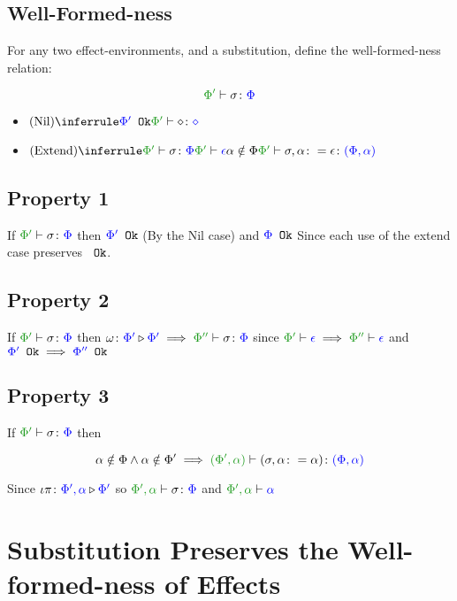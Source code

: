 {\subsection{Well-Formed-ness }

For any two effect-environments, and a substitution, define the well-formed-ness relation:

\begin{equation}
    \typerelation{\P'}{\si}{\P}
\end{equation}

\begin{itemize}
    \item $\ntreeruleI{Nil}{\ok{\P'}}{\typerelation{\P'}{\nil}{\nil}}$
    \item $\ntreeruleIII{Extend}{\typerelation{\P'}{\si}{\P}}{\wellformed{\P'}{\e}}{\a\notin\P}{\typerelation{\P'}{\si, \a \setto\e}{(\P, \a)}}$
\end{itemize}

\subsection{Property 1}
If $\typerelation{\P'}{\si}{\P}$ then ${\color{blue} \Phi'} \texttt{ Ok}$ (By  the 
Nil case) and ${\color{blue} \Phi} \texttt{ Ok}$ Since each use of the extend case preserves ${\color{blue} } \texttt{ Ok}$.

\subsection{Property 2}
If $\typerelation{\P'}{\si}{\P}$ then $\wrelw{\P'}{\P'} \implies \typerelation{\P''}{\si}{\P}$ since $\wellformed{\P'}{\e}\implies \wellformed{\P''}{\e}$ and ${\color{blue} \Phi'} \texttt{ Ok}\implies {\color{blue} \Phi''} \texttt{ Ok}$


\subsection{Property 3}
If $\typerelation{\P'}{\si}{\P}$ then

\begin{equation}
    \a\notin\P\wedge\a\notin\P' \implies \typerelation{(\P', \a)}{(\si, \a\setto\a)}{(\P,\a)}
\end{equation}

Since $\iota\pi \colon {\color{blue}\Phi',\alpha} \triangleright {\color {blue} \Phi'}$ so $\typerelation{\P',\a}{\si}{\P}$ and $\wellformed{\P',\a}{\a}$

\section{Substitution Preserves the Well-formed-ness of Effects}

}

